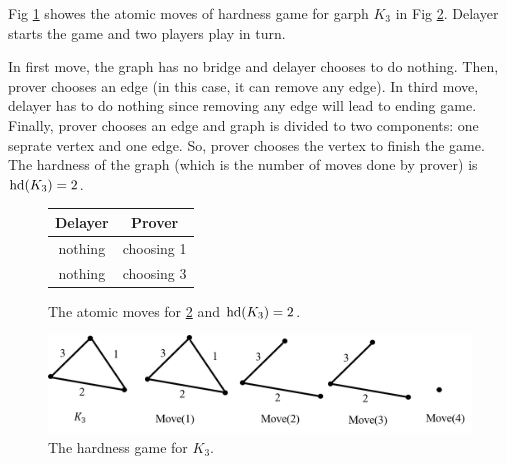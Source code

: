 \documentclass[]{book}
\begin{document}
\begin{examp}\label{exp:hd1}
       Fig \ref{fig:game1} showes the atomic moves of hardness game for garph $K_3$ in Fig \ref{fig:hd1}. Delayer starts the game and two 
	   players play in turn. 
	   
	   In first move, the graph has no bridge and delayer chooses to do nothing. Then, prover chooses an edge (in this case, it can 
	   remove any edge). In third move, delayer has to do nothing since removing any edge will lead to ending game. Finally, prover 
	   chooses an edge and graph is divided to two components: one seprate vertex and one edge. So, prover chooses the vertex to 
	   finish the game. The hardness of the graph (which is the number of moves done by prover) is $\operatorname{hd}(K_3)=2$.
	   
	   \begin{figure}[h]
       \centering
       \begin{tabular}{|c|c|} 
                  \hline
                  Delayer & Prover \\ \hline
                  nothing & choosing 1  \\ \hline
                  nothing & choosing 3  \\ \hline
       \end{tabular}
       \caption{The atomic moves for \ref{fig:hd1} and $\operatorname{hd}(K_3)=2$.}
       \label{fig:game1}
      \end{figure}
	  \begin{figure}
      \begin{center}
      \includegraphics[scale =0.6]{g1.png}
      \caption{The hardness game for $K_3$.}
	  \label{fig:hd1}
      \end{center}
      \end{figure}
\end{examp}
\end{document}
